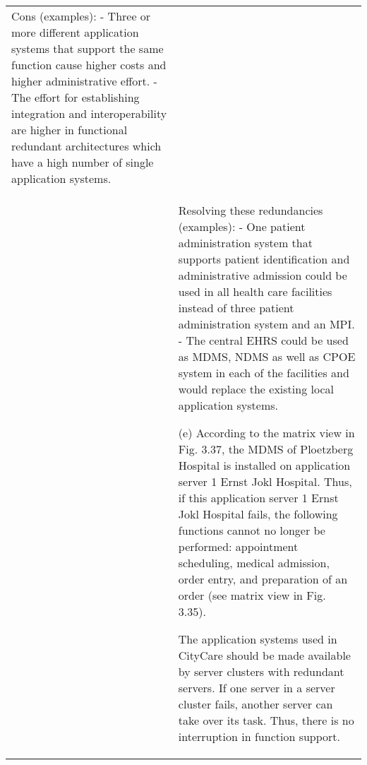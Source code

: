 \begin{landscape}
\begin{longtable}{p{3cm}p{}}
    Cons (examples):
    - Three or more different application systems that support the same function cause higher costs and higher administrative effort.
    - The effort for establishing integration and interoperability are higher in functional redundant architectures which have a high number of single application systems.\\
    & Resolving these redundancies (examples):
    - One patient administration system that supports patient identification and administrative admission could be used in all health care facilities instead of three patient administration system and an MPI.
    - The central EHRS could be used as MDMS, NDMS as well as CPOE system in each of the facilities and would replace the existing local application systems.

    (e) According to the matrix view in Fig. 3.37, the MDMS of Ploetzberg Hospital is installed on application server 1 Ernst Jokl Hospital.
    Thus, if this application server 1 Ernst Jokl Hospital fails, the following functions cannot no longer be performed: appointment scheduling, medical admission, order entry, and preparation of an order (see matrix view in Fig. 3.35).

    The application systems used in CityCare should be made available by server clusters with redundant servers.
    If one server in a server cluster fails, another server can take over its task.
    Thus, there is no interruption in function support.
        

\end{longtable}
\end{landscape}
